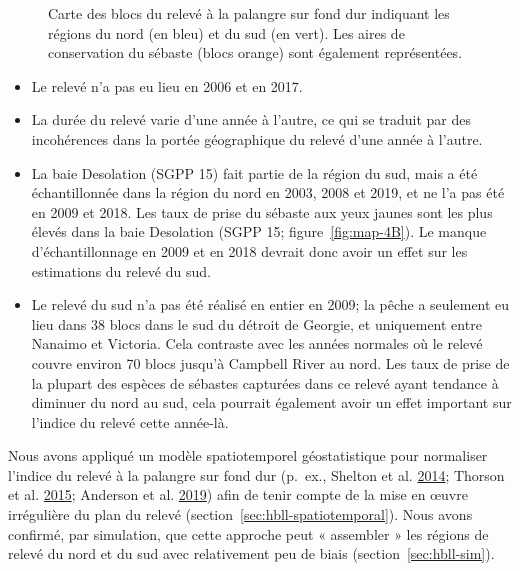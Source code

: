 \documentclass[11pt]{book}
\begin{document}
\begin{figure}[htb]

{\centering {} 

}

\caption{Carte des blocs du relevé à la palangre sur fond dur indiquant les régions du nord (en bleu) et du sud (en vert). Les aires de conservation du sébaste (blocs orange) sont également représentées.}\label{fig:map-HBLL-NS}
\end{figure}
\begin{itemize}

\item
  Le relevé n'a pas eu lieu en 2006 et en 2017.
\item
  La durée du relevé varie d'une année à l'autre, ce qui se traduit par des incohérences dans la portée géographique du relevé d'une année à l'autre.
\item
  La baie Desolation (SGPP 15) fait partie de la région du sud, mais a été échantillonnée dans la région du nord en 2003, 2008 et 2019, et ne l'a pas été en 2009 et 2018. Les taux de prise du sébaste aux yeux jaunes sont les plus élevés dans la baie Desolation (SGPP 15; figure~\ref{fig:map-4B}). Le manque d'échantillonnage en 2009 et en 2018 devrait donc avoir un effet sur les estimations du relevé du sud.
\item
  Le relevé du sud n'a pas été réalisé en entier en 2009; la pêche a seulement eu lieu dans 38 blocs dans le sud du détroit de Georgie, et uniquement entre Nanaimo et Victoria. Cela contraste avec les années normales où le relevé couvre environ 70 blocs jusqu'à Campbell River au nord. Les taux de prise de la plupart des espèces de sébastes capturées dans ce relevé ayant tendance à diminuer du nord au sud, cela pourrait également avoir un effet important sur l'indice du relevé cette année-là.
\end{itemize}
Nous avons appliqué un modèle spatiotemporel géostatistique pour normaliser l'indice du relevé à la palangre sur fond dur (p.~ex., Shelton et al. \protect\hyperlink{ref-shelton2014}{2014}; Thorson et al. \protect\hyperlink{ref-thorson2015}{2015}; Anderson et al. \protect\hyperlink{ref-anderson2019synopsis}{2019}) afin de tenir compte de la mise en œuvre irrégulière du plan du relevé (section~\ref{sec:hbll-spatiotemporal}). Nous avons confirmé, par simulation, que cette approche peut « assembler » les régions de relevé du nord et du sud avec relativement peu de biais (section~\ref{sec:hbll-sim}).
\end{document}
